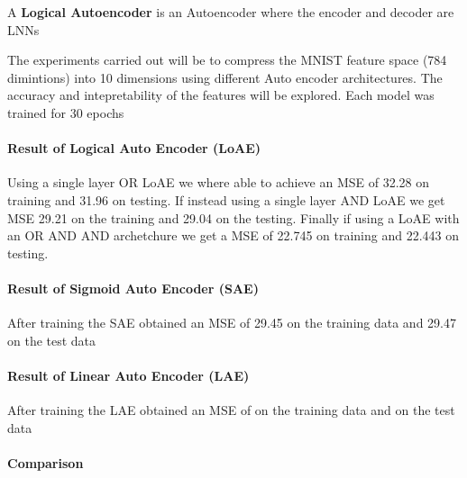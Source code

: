 \begin{definition} \label{def:logical-autoencoder}
	A \textbf{Logical Autoencoder} is an Autoencoder where the encoder and decoder are LNNs
\end{definition}

The experiments carried out will be to compress the MNIST feature space (784 dimintions) into 10 dimensions using different Auto encoder architectures. The accuracy and intepretability of the features will be explored. Each model was trained for 30 epochs

\paragraph{Result of Logical Auto Encoder (LoAE)}
Using a single layer OR LoAE we where able to achieve an MSE of 32.28 on training and 31.96 on testing. If instead using a single layer AND LoAE we get MSE 29.21 on the training and 29.04 on the testing. Finally if using a LoAE with an OR AND AND archetchure we get a MSE of 22.745 on training and 22.443 on testing.

\paragraph{Result of Sigmoid Auto Encoder (SAE)}
After training the SAE obtained an MSE of 29.45 on the training data and 29.47 on the test data

\paragraph{Result of Linear Auto Encoder (LAE)}
After training the LAE obtained an MSE of  on the training data and  on the test data

\paragraph{Comparison}

